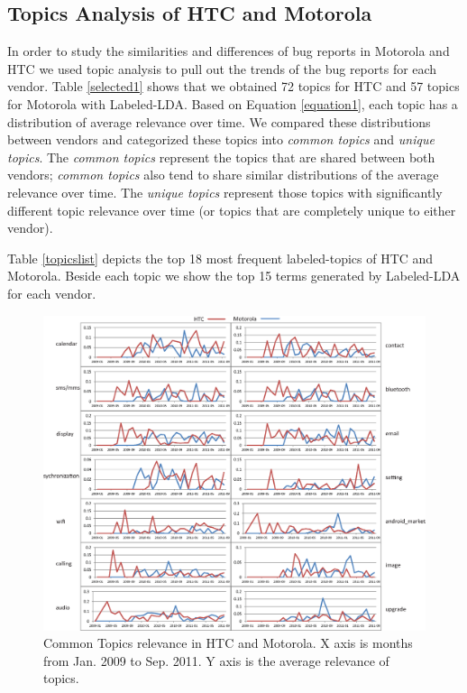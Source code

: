 \documentclass[10pt, conference, compsocconf]{IEEEtran}
\begin{document}
\subsection{Topics Analysis of HTC and Motorola}

In order to study the similarities and differences of bug reports in
Motorola and HTC we used topic analysis to pull out the trends of the
bug reports for each vendor.
Table \ref{selected1} shows that we obtained 72 topics for HTC and
57 topics for Motorola with Labeled-LDA.
Based on Equation \ref{equation1}, each topic has a distribution of
average relevance over time. 
We compared these distributions between vendors and categorized these
topics
into 
\textit{common topics} and \textit{unique topics}.
The \textit{common topics} represent the topics that are shared
between both vendors; \textit{common topics} also tend to share 
similar distributions of the average relevance over
time.
The \textit{unique topics} represent those topics with significantly
different topic relevance over time (or topics that are completely
unique to either vendor).



Table \ref{topicslist} depicts 
the top 18 most frequent labeled-topics of HTC and
Motorola.
Beside each topic we show the top 15 terms generated by Labeled-LDA for
each vendor. 

\begin{figure}
\centering
\includegraphics[width=1\textwidth]{commontopic.eps}
\caption{Common Topics relevance in HTC and Motorola. X axis is months from Jan. 2009 to Sep. 2011. Y axis is the average relevance of topics.}
\label{fixtopic}
\label{commontopic}
\end{figure}
\end{document}
